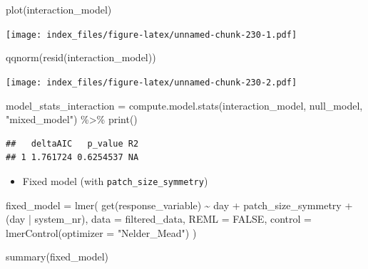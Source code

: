 \documentclass[
]{article}
\newenvironment{Shaded}{\begin{snugshade}}{\end{snugshade}}
\newcommand{\AttributeTok}[1]{\textcolor[rgb]{0.77,0.63,0.00}{#1}}
\newcommand{\ConstantTok}[1]{\textcolor[rgb]{0.00,0.00,0.00}{#1}}
\newcommand{\FunctionTok}[1]{\textcolor[rgb]{0.00,0.00,0.00}{#1}}
\newcommand{\NormalTok}[1]{#1}
\newcommand{\OtherTok}[1]{\textcolor[rgb]{0.56,0.35,0.01}{#1}}
\newcommand{\SpecialCharTok}[1]{\textcolor[rgb]{0.00,0.00,0.00}{#1}}
\newcommand{\StringTok}[1]{\textcolor[rgb]{0.31,0.60,0.02}{#1}}
\providecommand{\tightlist}{%
  \setlength{\itemsep}{0pt}\setlength{\parskip}{0pt}}
\begin{document}
\begin{Shaded}
\begin{Highlighting}[]
\FunctionTok{plot}\NormalTok{(interaction\_model)}
\end{Highlighting}
\end{Shaded}

\texttt{[image: index\_files/figure-latex/unnamed-chunk-230-1.pdf]}

\begin{Shaded}
\begin{Highlighting}[]
\FunctionTok{qqnorm}\NormalTok{(}\FunctionTok{resid}\NormalTok{(interaction\_model))}
\end{Highlighting}
\end{Shaded}

\texttt{[image: index\_files/figure-latex/unnamed-chunk-230-2.pdf]}

\begin{Shaded}
\begin{Highlighting}[]
\NormalTok{model\_stats\_interaction }\OtherTok{=} \FunctionTok{compute.model.stats}\NormalTok{(interaction\_model,}
\NormalTok{                                              null\_model,}
                                              \StringTok{"mixed\_model"}\NormalTok{) }\SpecialCharTok{\%\textgreater{}\%}
  \FunctionTok{print}\NormalTok{()}
\end{Highlighting}
\end{Shaded}

\begin{verbatim}
##   deltaAIC   p_value R2
## 1 1.761724 0.6254537 NA
\end{verbatim}

\begin{itemize}
\tightlist
\item
  Fixed model (with \texttt{patch\_size\_symmetry})
\end{itemize}

\begin{Shaded}
\begin{Highlighting}[]
\NormalTok{fixed\_model }\OtherTok{=} \FunctionTok{lmer}\NormalTok{(}
  \FunctionTok{get}\NormalTok{(response\_variable) }\SpecialCharTok{\textasciitilde{}}
\NormalTok{    day }\SpecialCharTok{+} 
\NormalTok{    patch\_size\_symmetry }\SpecialCharTok{+} 
\NormalTok{    (day }\SpecialCharTok{|}\NormalTok{ system\_nr), }
  \AttributeTok{data =}\NormalTok{ filtered\_data,}
  \AttributeTok{REML =} \ConstantTok{FALSE}\NormalTok{,}
  \AttributeTok{control =} \FunctionTok{lmerControl}\NormalTok{(}\AttributeTok{optimizer =} \StringTok{"Nelder\_Mead"}\NormalTok{)}
\NormalTok{)}

\FunctionTok{summary}\NormalTok{(fixed\_model)}
\end{Highlighting}
\end{Shaded}
\end{document}
